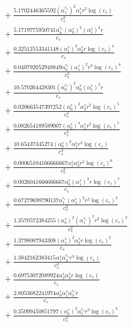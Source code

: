 \documentclass[10pt]{article}
\begin{document}
\begin{align*}
&{}  + \frac{5.1702446365592 \left(\alpha_{1}^{c_s}\right)^{2} \alpha_{1}^s r^{2} \log{\left(c_{s} \right)}}{c_{s}^{2}} \\
&{}  + \frac{5.1719775950741 \alpha_{0}^{c_s} \left(\alpha_{0}^s\right)^{2} \left(\alpha_{1}^s\right)^{2} r}{c_{s}} \\
&{}  + \frac{0.32512553341148 \left(\alpha_{1}^s\right)^{2} \alpha_{2}^s r \log{\left(c_{s} \right)}^{4}}{c_{s}} \\
&{}  + \frac{0.040792052948849 \alpha_{0}^{c_s} \left(\alpha_{1}^s\right)^{2} r^{3} \log{\left(c_{s} \right)}^{4}}{c_{s}^{3}} \\
&{}  + \frac{10.570264428301 \left(\alpha_{0}^{c_s}\right)^{2} \alpha_{0}^s \left(\alpha_{1}^s\right)^{2} r}{c_{s}} \\
&{}  + \frac{0.020663547397252 \left(\alpha_{0}^s\right)^{2} \alpha_{3}^s r^{2} \log{\left(c_{s} \right)}^{5}}{c_{s}^{2}} \\
&{}  + \frac{0.082654189589007 \left(\alpha_{0}^s\right)^{4} \alpha_{1}^s r^{2} \log{\left(c_{s} \right)}^{5}}{c_{s}^{2}} \\
&{}  + \frac{10.65437345274 \left(\alpha_{0}^s\right)^{3} \alpha_{1}^s r^{3} \log{\left(c_{s} \right)}}{c_{s}^{3}} \\
&{}  + \frac{0.00065104166666667 \alpha_{1}^s \alpha_{3}^s r^{2} \log{\left(c_{s} \right)}^{6}}{c_{s}^{2}} \\
&{}  + \frac{0.0026041666666667 \alpha_{0}^s \left(\alpha_{1}^s\right)^{3} r \log{\left(c_{s} \right)}^{7}}{c_{s}} \\
&{}  + \frac{0.67279698790137 \alpha_{1}^{c_s} \left(\alpha_{1}^s\right)^{2} r^{2} \log{\left(c_{s} \right)}^{3}}{c_{s}^{2}} \\
&{}  + \frac{1.3570572384255 \left(\alpha_{0}^s\right)^{2} \left(\alpha_{1}^{c_s}\right)^{2} r^{2} \log{\left(c_{s} \right)}^{2}}{c_{s}^{2}} \\
&{}  + \frac{1.3798087943308 \left(\alpha_{1}^s\right)^{2} \alpha_{2}^s r \log{\left(c_{s} \right)}^{2}}{c_{s}} \\
&{}  + \frac{1.3842162383415 \alpha_{1}^s \alpha_{2}^{c_s} r^{3} \log{\left(c_{s} \right)}}{c_{s}^{3}} \\
&{}  + \frac{0.69753072089924 \alpha_{2}^s \alpha_{3}^s r \log{\left(c_{s} \right)}}{c_{s}} \\
&{}  + \frac{2.8053682241974 \alpha_{0}^s \alpha_{1}^s \alpha_{3}^{c_s} r}{c_{s}} \\
&{}  + \frac{0.35099450851797 \left(\alpha_{0}^s\right)^{3} \alpha_{1}^{c_s} r^{3} \log{\left(c_{s} \right)}^{3}}{c_{s}^{3}} \\

\end{align*}
\end{document}
